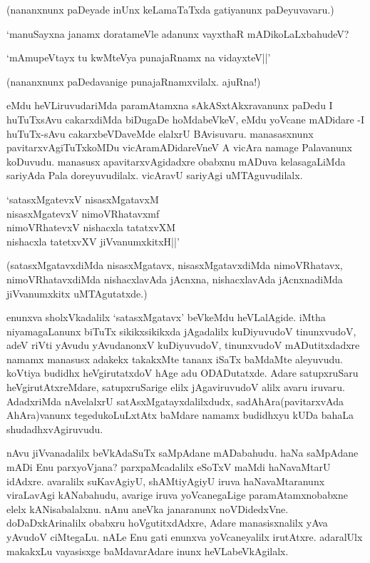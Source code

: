 (nananxnunx paDeyade inUnx keLamaTaTxda gatiyanunx paDeyuvavaru.)

`manuSayxna janamx doratameVle adanunx vayxthaR mADikoLaLxbahudeV?

\begin{shloka}
`mAmupeVtayx tu kwMteVya punajaRnamx na vidayxteV||'
\end{shloka}

(nananxnunx paDedavanige punajaRnamxvilalx. ajuRna!)

eMdu heVLiruvudariMda paramAtamxna sAkASxtAkxravanunx paDedu I huTuTxsAvu cakarxdiMda biDugaDe hoMdabeVkeV, eMdu yoVcane mADidare -I huTuTx-sAvu cakarxbeVDaveMde elalxrU BAvisuvaru. manasasxnunx pavitarxvAgiTuTxkoMDu vicAramADidareVneV A vicAra namage Palavanunx koDuvudu. manasusx apavitarxvAgidadxre obabxnu mADuva kelasagaLiMda sariyAda Pala doreyuvudilalx. vicAravU sariyAgi uMTAguvudilalx.

\begin{shloka}
`satasxMgatevxV nisasxMgatavxM\\
nisasxMgatevxV nimoVRhatavxmf\\
nimoVRhatevxV nishacxla tatatxvXM\\
nishacxla tatetxvXV jiVvanumxkitxH||'
\end{shloka}

(satasxMgatavxdiMda nisasxMgatavx, nisasxMgatavxdiMda nimoVRhatavx, nimoVRhatavxdiMda nishacxlavAda jAcnxna, nishacxlavAda jAcnxnadiMda jiVvanumxkitx uMTAgutatxde.)

enunxva sholxVkadalilx `satasxMgatavx' beVkeMdu heVLalAgide. iMtha niyamagaLanunx biTuTx sikikxsikikxda jAgadalilx kuDiyuvudoV tinunxvudoV, adeV riVti yAvudu yAvudanonxV kuDiyuvudoV, tinunxvudoV mADutitxdadxre namamx manasusx adakekx takakxMte tananx iSaTx baMdaMte aleyuvudu. koVtiya budidhx heVgirutatxdoV hAge adu ODADutatxde. Adare satupxruSaru heVgirutAtxreMdare, satupxruSarige elilx jAgaviruvudoV alilx avaru iruvaru. AdadxriMda nAvelalxrU satAsxMgatayxdalilxdudx, sadAhAra(pavitarxvAda AhAra)vanunx tegedukoLuLxtAtx baMdare namamx budidhxyu kUDa bahaLa shudadhxvAgiruvudu.

nAvu jiVvanadalilx beVkAdaSuTx saMpAdane mADabahudu. haNa saMpAdane mADi Enu parxyoVjana? parxpaMcadalilx eSoTxV maMdi haNavaMtarU idAdxre. avaralilx suKavAgiyU, shAMtiyAgiyU iruva haNavaMtaranunx viraLavAgi kANabahudu, avarige iruva yoVcanegaLige paramAtamxnobabxne elelx kANisabalalxnu. nAnu aneVka janaranunx noVDidedxVne. doDaDxkArinalilx obabxru hoVgutitxdAdxre, Adare manasisxnalilx yAva yAvudoV ciMtegaLu. nALe Enu gati enunxva yoVcaneyalilx irutAtxre. adaralUlx makakxLu vayasisxge baMdavarAdare inunx heVLabeVkAgilalx.

